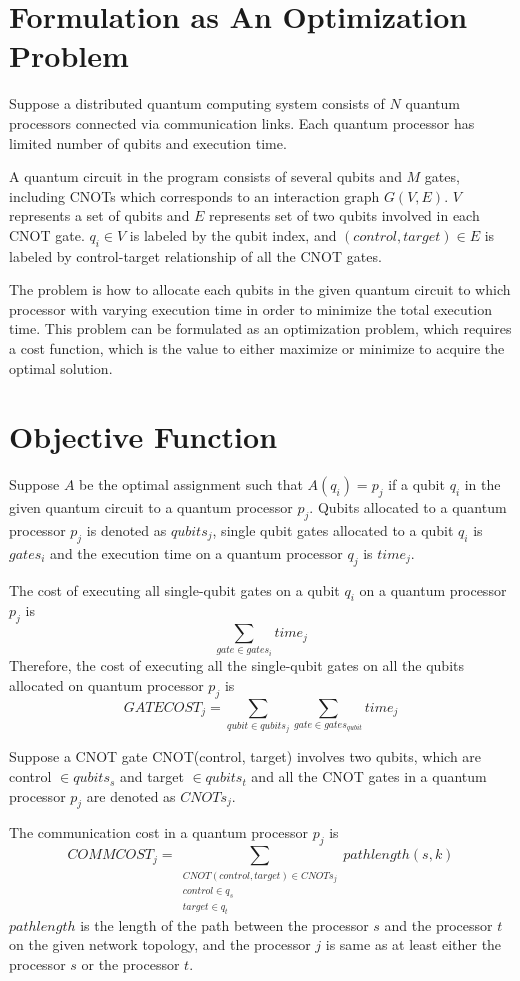 \section{Formulation as An Optimization Problem}

Suppose a distributed quantum computing system consists of $N$ quantum processors connected via communication links. Each quantum processor has limited number of qubits and execution time.

A quantum circuit in the program consists of several qubits and $M$ gates, including CNOTs which corresponds to an interaction graph $G(V, E)$. $V$ represents a set of qubits and $E$ represents set of two qubits involved in each CNOT gate.  $q_i \in V$ is labeled by the qubit index, and $(control, target) \in E$ is labeled by control-target relationship of all the CNOT gates.

The problem is how to allocate each qubits in the given quantum circuit to which processor with varying execution time in order to minimize the total execution time. This problem can be formulated as an optimization problem, which requires a cost function, which is the value to either maximize or minimize to acquire the optimal solution.

\section{Objective Function}
Suppose $A$ be the optimal assignment such that $A(q_i) = p_j$ if a qubit $q_i$ in the given quantum circuit to a quantum processor $p_j$. Qubits allocated to a quantum processor $p_j$ is denoted as $qubits_j$, single qubit gates allocated to a qubit $q_i$ is $gates_i$ and the execution time on a quantum processor $q_j$ is $time_j$.

The cost of executing all single-qubit gates on a qubit $q_i$ on a quantum processor $p_j$ is 
$$\sum_{gate \in gates_i} time_j$$
Therefore, the cost of executing all the single-qubit gates on all the qubits allocated on quantum processor $p_j$ is 
$$GATECOST_j = \sum_{qubit \in qubits_j} \sum_{gate \in gates_{qubit}} time_j$$

Suppose a CNOT gate CNOT(control, target) involves two qubits, which are control $\in qubits_s$ and target $\in qubits_t$ and all the CNOT gates in a quantum processor $p_j$ are denoted as $CNOTs_{j}$.

The communication cost in a quantum processor $p_j$ is 
$$COMMCOST_j = \sum_{ \substack{CNOT (control, target) \in CNOTs_{j} \\ control \in q_s \\ target \in q_t}} pathlength(s, k)$$
$pathlength$ is the length of the path between the processor $s$ and the processor $t$ on the given network topology, and the processor $j$ is same as at least either the processor $s$ or the processor $t$.

